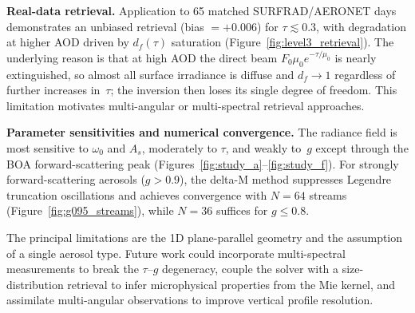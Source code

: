 \documentclass[a4paper, 11pt]{article}
\begin{document}
\textbf{Real-data retrieval.}  Application to 65 matched SURFRAD/AERONET days demonstrates an unbiased retrieval (bias $= +0.006$) for $\tau \lesssim 0.3$, with degradation at higher AOD driven by $d_f(\tau)$ saturation (Figure~\ref{fig:level3_retrieval}).  The underlying reason is that at high AOD the direct beam $F_0\mu_0 e^{-\tau/\mu_0}$ is nearly extinguished, so almost all surface irradiance is diffuse and $d_f \to 1$ regardless of further increases in~$\tau$; the inversion then loses its single degree of freedom.  This limitation motivates multi-angular or multi-spectral retrieval approaches.

\textbf{Parameter sensitivities and numerical convergence.}  The radiance field is most sensitive to $\omega_0$ and $A_s$, moderately to $\tau$, and weakly to~$g$ except through the BOA forward-scattering peak (Figures~\ref{fig:study_a}--\ref{fig:study_f}).  For strongly forward-scattering aerosols ($g > 0.9$), the delta-M method suppresses Legendre truncation oscillations and achieves convergence with $N = 64$ streams (Figure~\ref{fig:g095_streams}), while $N = 36$ suffices for $g \leq 0.8$.

The principal limitations are the 1D plane-parallel geometry and the assumption of a single aerosol type.  Future work could incorporate multi-spectral measurements to break the $\tau$--$g$ degeneracy, couple the solver with a size-distribution retrieval to infer microphysical properties from the Mie kernel, and assimilate multi-angular observations to improve vertical profile resolution.

\newpage

\end{document}
